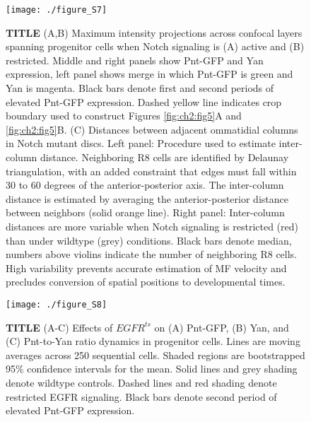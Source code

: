 \begin{figure}[h]
\centering
\texttt{[image: ./figure\_S7]}
\caption[TITLE]{\textbf{TITLE} (A,B) Maximum intensity projections across confocal layers spanning progenitor cells when Notch signaling is (A) active and (B) restricted. Middle and right panels show Pnt-GFP and Yan expression, left panel shows merge in which Pnt-GFP is green and Yan is magenta. Black bars denote first and second periods of elevated Pnt-GFP expression. Dashed yellow line indicates crop boundary used to construct Figures \ref{fig:ch2:fig5}A and \ref{fig:ch2:fig5}B. (C) Distances between adjacent ommatidial columns in Notch mutant discs. Left panel: Procedure used to estimate inter-column distance. Neighboring R8 cells are identified by Delaunay triangulation, with an added constraint that edges must fall within 30 to 60 degrees of the anterior-posterior axis. The inter-column distance is estimated by averaging the anterior-posterior distance between neighbors (solid orange line). Right panel: Inter-column distances are more variable when Notch signaling is restricted (red) than under wildtype (grey) conditions. Black bars denote median, numbers above violins indicate the number of neighboring R8 cells. High variability prevents accurate estimation of MF velocity and precludes conversion of spatial positions to developmental times.}
\label{fig:ch2:figS7}
\end{figure}

\begin{figure}[h]
\centering
\texttt{[image: ./figure\_S8]}
\caption[TITLE]{\textbf{TITLE} (A-C) Effects of $EGFR^{ts}$ on (A) Pnt-GFP, (B) Yan, and (C) Pnt-to-Yan ratio dynamics in progenitor cells. Lines are moving averages across 250 sequential cells. Shaded regions are bootstrapped 95\% confidence intervals for the mean. Solid lines and grey shading denote wildtype controls. Dashed lines and red shading denote restricted EGFR signaling. Black bars denote second period of elevated Pnt-GFP expression.}
\label{fig:ch2:figS8}
\end{figure}

